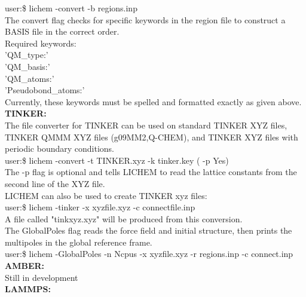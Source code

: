 \documentclass[12pt]{report}
\begin{document}
user:\$ lichem -convert -b regions.inp \\

The convert flag checks for specific keywords in the region file to construct
a BASIS file in the correct order. \\

Required keywords: \\
'QM\_type:' \\
'QM\_basis:' \\
'QM\_atoms:' \\
'Pseudobond\_atoms:' \\

Currently, these keywords must be spelled and formatted exactly as given
above. \\

{\textbf{TINKER:}} \\

The file converter for TINKER can be used on standard TINKER XYZ files,
TINKER QMMM XYZ files (g09MM2,Q-CHEM), and TINKER XYZ files with periodic
boundary conditions. \\

user:\$ lichem -convert -t TINKER.xyz -k tinker.key ( -p Yes) \\

The -p flag is optional and tells LICHEM to read the lattice constants from
the second line of the XYZ file. \\

LICHEM can also be used to create TINKER xyz files: \\

user:\$ lichem -tinker -x xyzfile.xyz -c connectfile.inp \\

A file called "tinkxyz.xyz" will be produced from this conversion. \\

The GlobalPoles flag reads the force field and initial structure, then prints
the multipoles in the global reference frame. \\

user:\$ lichem -GlobalPoles -n Ncpus -x xyzfile.xyz -r regions.inp
 -c connect.inp \\

{\textbf{AMBER:}} \\

{\color{red}Still in development} \\

{\textbf{LAMMPS:}} \\
\end{document}
